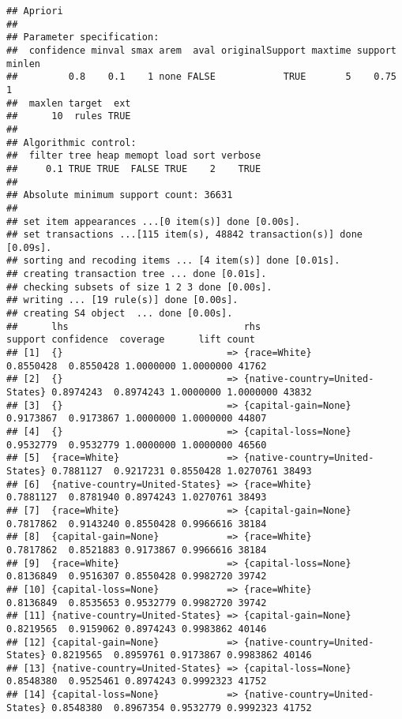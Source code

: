 \documentclass[
]{article}
\begin{document}
\begin{verbatim}
## Apriori
## 
## Parameter specification:
##  confidence minval smax arem  aval originalSupport maxtime support minlen
##         0.8    0.1    1 none FALSE            TRUE       5    0.75      1
##  maxlen target  ext
##      10  rules TRUE
## 
## Algorithmic control:
##  filter tree heap memopt load sort verbose
##     0.1 TRUE TRUE  FALSE TRUE    2    TRUE
## 
## Absolute minimum support count: 36631 
## 
## set item appearances ...[0 item(s)] done [0.00s].
## set transactions ...[115 item(s), 48842 transaction(s)] done [0.09s].
## sorting and recoding items ... [4 item(s)] done [0.01s].
## creating transaction tree ... done [0.01s].
## checking subsets of size 1 2 3 done [0.00s].
## writing ... [19 rule(s)] done [0.00s].
## creating S4 object  ... done [0.00s].
##      lhs                               rhs                              support confidence  coverage      lift count
## [1]  {}                             => {race=White}                   0.8550428  0.8550428 1.0000000 1.0000000 41762
## [2]  {}                             => {native-country=United-States} 0.8974243  0.8974243 1.0000000 1.0000000 43832
## [3]  {}                             => {capital-gain=None}            0.9173867  0.9173867 1.0000000 1.0000000 44807
## [4]  {}                             => {capital-loss=None}            0.9532779  0.9532779 1.0000000 1.0000000 46560
## [5]  {race=White}                   => {native-country=United-States} 0.7881127  0.9217231 0.8550428 1.0270761 38493
## [6]  {native-country=United-States} => {race=White}                   0.7881127  0.8781940 0.8974243 1.0270761 38493
## [7]  {race=White}                   => {capital-gain=None}            0.7817862  0.9143240 0.8550428 0.9966616 38184
## [8]  {capital-gain=None}            => {race=White}                   0.7817862  0.8521883 0.9173867 0.9966616 38184
## [9]  {race=White}                   => {capital-loss=None}            0.8136849  0.9516307 0.8550428 0.9982720 39742
## [10] {capital-loss=None}            => {race=White}                   0.8136849  0.8535653 0.9532779 0.9982720 39742
## [11] {native-country=United-States} => {capital-gain=None}            0.8219565  0.9159062 0.8974243 0.9983862 40146
## [12] {capital-gain=None}            => {native-country=United-States} 0.8219565  0.8959761 0.9173867 0.9983862 40146
## [13] {native-country=United-States} => {capital-loss=None}            0.8548380  0.9525461 0.8974243 0.9992323 41752
## [14] {capital-loss=None}            => {native-country=United-States} 0.8548380  0.8967354 0.9532779 0.9992323 41752

\end{verbatim}
\end{document}
